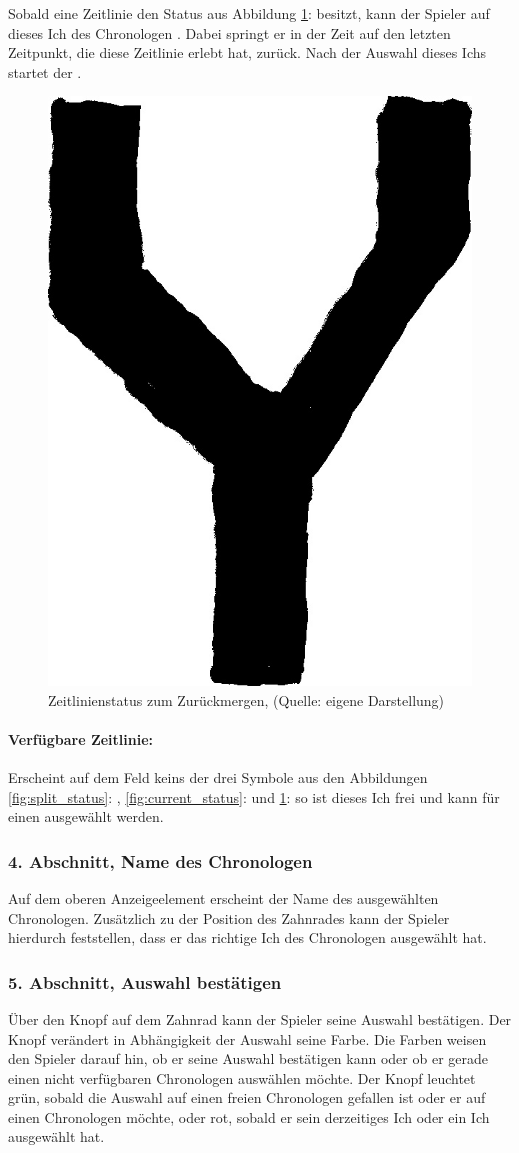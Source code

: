 Sobald eine Zeitlinie den Status aus Abbildung \ref{fig:merge_status}:  besitzt, kann der Spieler auf dieses Ich des Chronologen . 
Dabei springt er in der Zeit auf den letzten Zeitpunkt, die diese Zeitlinie erlebt hat, zurück. 
Nach der Auswahl dieses Ichs startet der .

\begin{figure}[ht]
\centering
\includegraphics[width=0.15\linewidth]{content/pictures/Merge_icon_trnsp.jpg}
\caption{Zeitlinienstatus zum Zurückmergen, (Quelle: eigene Darstellung)}
\label{fig:merge_status}
\end{figure}

\paragraph{Verfügbare Zeitlinie:}

Erscheint auf dem Feld keins der drei Symbole aus den Abbildungen \ref{fig:split_status}: , \ref{fig:current_status}:  und \ref{fig:merge_status}:  so ist dieses Ich frei und kann für einen  ausgewählt werden.

\subsubsection{4. Abschnitt, Name des Chronologen}

Auf dem oberen Anzeigeelement erscheint der Name des ausgewählten Chronologen. Zusätzlich zu der Position des Zahnrades kann der Spieler hierdurch feststellen, dass er das richtige Ich des Chronologen ausgewählt hat.

\subsubsection{5. Abschnitt, Auswahl bestätigen}

Über den Knopf auf dem Zahnrad kann der Spieler seine Auswahl bestätigen. Der Knopf verändert in Abhängigkeit der Auswahl seine Farbe. Die Farben weisen den Spieler darauf hin, ob er seine Auswahl bestätigen kann oder ob er gerade einen nicht verfügbaren Chronologen auswählen möchte. Der Knopf leuchtet grün, sobald die Auswahl auf einen freien Chronologen gefallen ist oder er auf einen Chronologen  möchte, oder rot, sobald er sein derzeitiges Ich oder ein  Ich ausgewählt hat.

